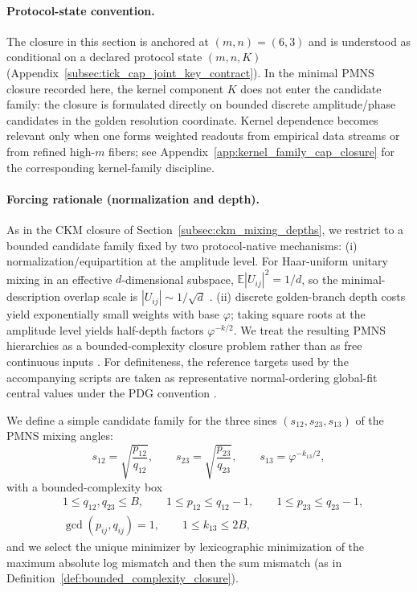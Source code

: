 \paragraph{Protocol-state convention.}
\AuditTag The closure in this section is anchored at $(m,n)=(6,3)$ and is understood as conditional on a declared protocol state $(m,n,K)$ (Appendix~\ref{subsec:tick_cap_joint_key_contract}).
In the minimal PMNS closure recorded here, the kernel component $K$ does not enter the candidate family: the closure is formulated directly on bounded discrete amplitude/phase candidates in the golden resolution coordinate.
Kernel dependence becomes relevant only when one forms weighted readouts from empirical data streams or from refined high-$m$ fibers; see Appendix~\ref{app:kernel_family_cap_closure} for the corresponding kernel-family discipline.

\paragraph{Forcing rationale (normalization and depth).}
As in the CKM closure of Section~\ref{subsec:ckm_mixing_depths}, we restrict to a bounded candidate family fixed by two protocol-native mechanisms:
(i) normalization/equipartition at the amplitude level.
For Haar-uniform unitary mixing in an effective $d$-dimensional subspace, $\mathbb{E}|U_{ij}|^2=1/d$, so the minimal-description overlap scale is $|U_{ij}|\sim 1/\sqrt{d}$ \cite{Mezzadri2007,CollinsSnady2006}.
(ii) discrete golden-branch depth costs yield exponentially small weights with base $\varphi$; taking square roots at the amplitude level yields half-depth factors $\varphi^{-k/2}$.
We treat the resulting PMNS hierarchies as a bounded-complexity closure problem rather than as free continuous inputs \cite{PDGRPP2024,Esteban2020NuFIT}.
For definiteness, the reference targets used by the accompanying scripts are taken as representative normal-ordering global-fit central values under the PDG convention \cite{PDGRPP2024,Esteban2020NuFIT}.

We define a simple candidate family for the three sines $(s_{12},s_{23},s_{13})$ of the PMNS mixing angles:
\[
s_{12}=\sqrt{\frac{p_{12}}{q_{12}}},\qquad
s_{23}=\sqrt{\frac{p_{23}}{q_{23}}},\qquad
s_{13}=\varphi^{-k_{13}/2},
\]
with a bounded-complexity box
\[
\begin{aligned}
&1\le q_{12},q_{23}\le B,\qquad 1\le p_{12}\le q_{12}-1,\qquad 1\le p_{23}\le q_{23}-1,\\
&\gcd(p_{ij},q_{ij})=1,\qquad 1\le k_{13}\le 2B,
\end{aligned}
\]
and we select the unique minimizer by lexicographic minimization of the maximum absolute log mismatch and then the sum mismatch (as in Definition~\ref{def:bounded_complexity_closure}).

